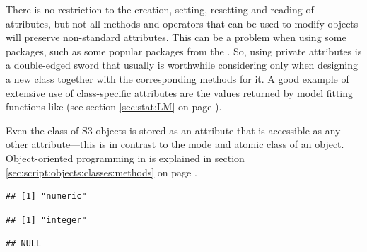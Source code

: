 \documentclass[krantz2]{krantz}\usepackage{knitr}
\begin{document}
\begin{warningbox}
There is no restriction to the creation, setting, resetting and reading of attributes, but not all methods and operators that can be used to modify objects will preserve non-standard attributes. This can be a problem when using some \Rlang packages, such as some popular packages from the . So, using private attributes is a double-edged sword that usually is worthwhile considering only when designing a new class together with the corresponding methods for it. A good example of extensive use of class-specific attributes are the values returned by model fitting functions like  (see section \ref{sec:stat:LM} on page \pageref{sec:stat:LM}).

Even the class of S3 objects is stored as an attribute that is accessible as any other attribute---this is in contrast to the mode and atomic class of an object. Object-oriented programming in \Rlang is explained in section \ref{sec:script:objects:classes:methods} on page \pageref{sec:script:objects:classes:methods}.

\begin{knitrout}\footnotesize
{}\color{fgcolor}\begin{kframe}
\begin{alltt}
 \hlkwb{<-} \hlopt{:}
\end{alltt}
\begin{verbatim}
## [1] "numeric"
\end{verbatim}
\begin{alltt}
\end{alltt}
\begin{verbatim}
## [1] "integer"
\end{verbatim}
\begin{alltt}
\end{alltt}
\begin{verbatim}
## NULL
\end{verbatim}
\end{kframe}
\end{knitrout}


\end{warningbox}
\end{document}
